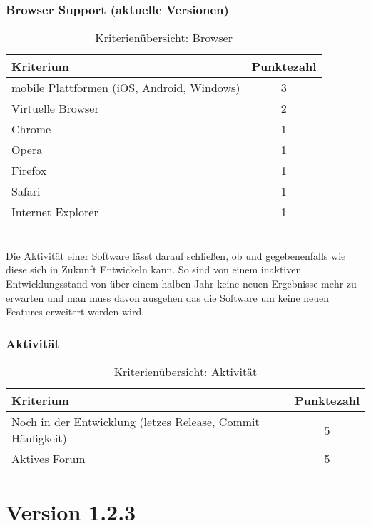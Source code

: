 \subsubsection{Browser Support (aktuelle Versionen)} 
\begin{table}[H]
 	\vspace{-30pt}
 	\centering
		\begin{tabular}{| p{12cm} | c|}
			\hline
				Kriterium		 &	Punktezahl\\
			\hline
			\hline
				mobile Plattformen (iOS, Android, Windows)			&3\\
				Virtuelle Browser	&	2	\\
				Chrome				&	1	\\
				Opera				&	1	\\
				Firefox				&	1	\\
				Safari				&	1	\\
				Internet Explorer		&	1	\\
				\hline
		\end{tabular}
	\caption{Kriterienübersicht: Browser}
\end{table}

\\Die Aktivität einer Software lässt darauf schließen, ob und gegebenenfalls wie diese sich in Zukunft Entwickeln kann. So sind von einem inaktiven Entwicklungsstand von über einem halben Jahr keine neuen Ergebnisse mehr zu erwarten und man muss davon ausgehen das die Software um keine neuen Features erweitert werden wird.
\subsubsection{Aktivität}
\begin{table}[H]
 	\vspace{-30pt}
 	\centering
		\begin{tabular}{| p{12cm} | c|}
			\hline
				Kriterium		 &	Punktezahl\\
			\hline
			\hline
				Noch in der Entwicklung (letzes Release, Commit Häufigkeit)			&5\\
				Aktives Forum	&	5	\\
				\hline
		\end{tabular}
	\caption{Kriterienübersicht: Aktivität}
\end{table}



	\pagebreak
	\section{ Version 1.2.3}
